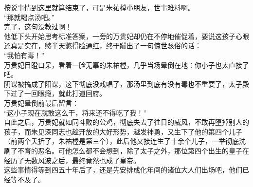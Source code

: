 \begin{multicols}{\theparacolNo}
按说事情到这里就算结束了，可是朱祐樘小朋友，世事难料啊。\\

“那就喝点汤吧。”\\

完了，这句没教过啊！\\

他低下头开始思考标准答案，一旁的万贵妃却仍在不停地催促着，要说这孩子心眼还真是实在，憋半天憋得脸通红，终于蹦出了一句惊世骇俗的话：\\

“我怕有毒！”\\

万贵妃目瞪口呆，看着一脸无辜的朱祐樘，几乎当场晕倒在地：你小子也太直接了吧。\\

阴谋被搞成了阳谋，这下彻底没戏唱了，那汤里到底有没有毒也不重要了，太子殿下过了一回眼瘾，就此打道回府。\\

万贵妃晕倒前最后留言：\\

“这小子现在就敢这么干，将来还不得吃了我！”\\

自此之后，万贵妃就如同斗败的公鸡，彻底失去了往日的威风，不敢再堕掉别人的孩子，而朱见深同志也趁开放的大好形势，越发神勇，又生下了他的第四个儿子（前两个夭折了，朱祐樘是第三个），此后他又接连生了十余个儿子，一举彻底洗刷了不育的恶名。可他怎么都不会想到，除了太子之外，那位第四个出生的皇子在经历了无数风波之后，最终竟然也成了皇帝。\\

这些事情得等到四五十年后了，还是先安排成化年间的诸位大人们出场吧，他们已经等不及了。\\
\ifnum{}
	\end{multicols}
\fi
\newpage
